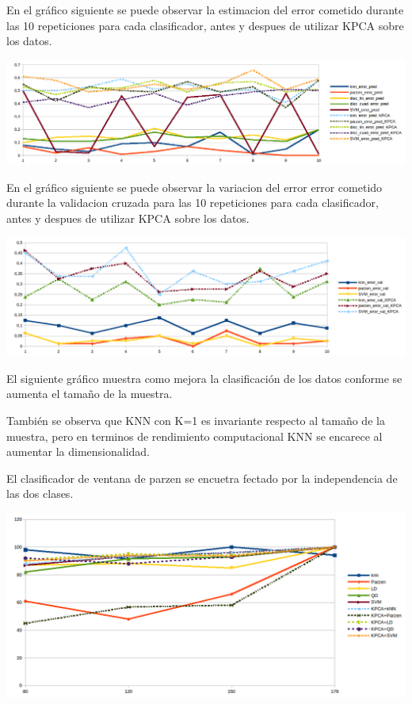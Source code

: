 \documentclass[fleqn,10pt]{SelfArx}
\begin{document}
En el gráfico siguiente se puede observar la estimacion del error cometido durante las 10 repeticiones para cada clasificador, antes y despues de utilizar KPCA sobre los datos.

\begin{center}
\includegraphics[scale=0.35]{fig/1.png} 
\end{center}

En el gráfico siguiente se puede observar la variacion del error error cometido durante la validacion cruzada para las 10 repeticiones para cada clasificador, antes y despues de utilizar KPCA sobre los datos.

\begin{center}
\includegraphics[scale=0.35]{fig/2.png} 
\end{center}

El siguiente gráfico muestra como mejora la clasificación de los datos conforme se aumenta el tamaño de la muestra. 

También se observa que KNN con K=1 es invariante respecto al tamaño de la muestra, pero en terminos de rendimiento computacional KNN se encarece al aumentar la dimensionalidad.

El clasificador de ventana de parzen se encuetra fectado por la independencia de las dos clases.  

\begin{center}
\includegraphics[scale=0.35]{fig/3.png} 
\end{center}
\end{document}

